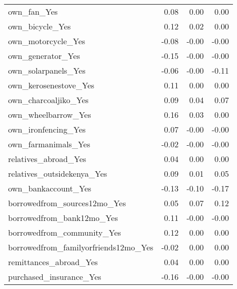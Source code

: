 \begin{longtable}{lrrr}
own\_fan\_Yes &                0.08 &                0.00 &                      0.00 \\
own\_bicycle\_Yes &                0.12 &                0.02 &                      0.00 \\
own\_motorcycle\_Yes &               -0.08 &               -0.00 &                     -0.00 \\
own\_generator\_Yes &               -0.15 &               -0.00 &                     -0.00 \\
own\_solarpanels\_Yes &               -0.06 &               -0.00 &                     -0.11 \\
own\_kerosenestove\_Yes &                0.11 &                0.00 &                      0.00 \\
own\_charcoaljiko\_Yes &                0.09 &                0.04 &                      0.07 \\
own\_wheelbarrow\_Yes &                0.16 &                0.03 &                      0.00 \\
own\_ironfencing\_Yes &                0.07 &               -0.00 &                     -0.00 \\
own\_farmanimals\_Yes &               -0.02 &               -0.00 &                     -0.00 \\
relatives\_abroad\_Yes &                0.04 &                0.00 &                      0.00 \\
relatives\_outsidekenya\_Yes &                0.09 &                0.01 &                      0.05 \\
 own\_bankaccount\_Yes &               -0.13 &               -0.10 &                     -0.17 \\
borrowedfrom\_sources12mo\_Yes &                0.05 &                0.07 &                      0.12 \\
borrowedfrom\_bank12mo\_Yes &                0.11 &               -0.00 &                     -0.00 \\
borrowedfrom\_community\_Yes &                0.12 &                0.00 &                      0.00 \\
borrowedfrom\_familyorfriends12mo\_Yes &               -0.02 &                0.00 &                      0.00 \\
remittances\_abroad\_Yes &                0.04 &                0.00 &                      0.00 \\
purchased\_insurance\_Yes &               -0.16 &               -0.00 &                     -0.00 \\

\end{longtable}
